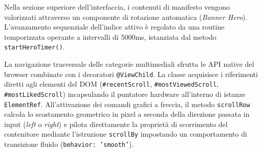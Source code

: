\documentclass[11pt,a4paper]{article}
\begin{document}
\begin{itemize}
    Nella sezione superiore dell'interfaccia, i contenuti di manifesto vengono valorizzati attraverso un componente di rotazione automatica (\textit{Banner Hero}). L'avanzamento sequenziale dell'indice attivo è regolato da una routine temporizzata operante a intervalli di 5000ms, istanziata dal metodo \texttt{startHeroTimer()}. 
    
    La navigazione trasversale delle categorie multimediali sfrutta le API native del browser combinate con i decoratori \texttt{@ViewChild}. La classe acquisisce i riferimenti diretti agli elementi del DOM (\texttt{\#recentScroll}, \texttt{\#mostViewedScroll}, \texttt{\#mostLikedScroll}) incapsulando il puntatore hardware all'interno di istanze \texttt{ElementRef}. All'attivazione dei comandi grafici a freccia, il metodo \texttt{scrollRow} calcola lo scostamento geometrico in pixel a seconda della direzione passata in input (\textit{left} o \textit{right}) e pilota direttamente la proprietà di scorrimento del contenitore mediante l'istruzione \texttt{scrollBy} impostando un comportamento di transizione fluido (\texttt{behavior: 'smooth'}). 
    

\end{itemize}
\end{document}
